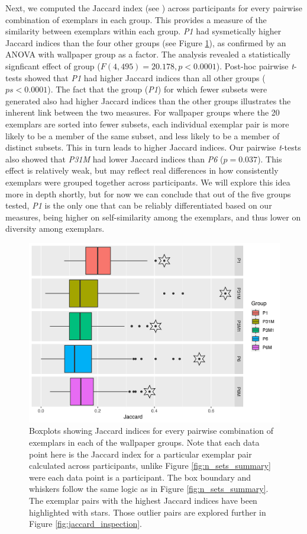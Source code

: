 \documentclass[11pt, twoside]{article}
\begin{document}
Next, we computed the Jaccard index (see ) across participants for every pairwise combination of exemplars in each group. This provides a measure of the similarity between exemplars within each group. \textit{P1} had sysmetically higher Jaccard indices than the four other groups (see Figure \ref{fig:jaccard_summary}), as confirmed by an ANOVA with wallpaper group as a factor. The analysis revealed a statistically signficant effect of group ($F(4, 495)=20.178, p < 0.0001$). Post-hoc pairwise \textit{t}-tests showed that \textit{P1} had higher Jaccard indices than all other groups ($ps < 0.0001$). The fact that the group (\textit{P1}) for which fewer subsets were generated also had higher Jaccard indices than the other groups illustrates the inherent link between the two measures. For wallpaper groups where the 20 exemplars are sorted into fewer subsets, each individual exemplar pair is more likely to be a member of the same subset, and less likely to be a member of distinct subsets. This in turn leads to higher Jaccard indices. Our pairwise \textit{t}-tests also showed that \textit{P31M} had lower Jaccard indices than \textit{P6} ($p = 0.037$). This effect is relatively weak, but may reflect real differences in how consistently exemplars were grouped together across participants. We will explore this idea more in depth shortly, but for now we can conclude that out of the five groups tested, \textit{P1} is the only one that can be reliably differentiated based on our measures, being higher on self-similarity among the exemplars, and thus lower on diversity among exemplars. 

\begin{figure}[t]
	\centering
	\includegraphics[width=\linewidth]{./figures/jaccard_summary.pdf}
	\caption{Boxplots showing Jaccard indices for every pairwise combination of exemplars in each of the wallpaper groups. Note that each data point here is the Jaccard index for a particular exemplar pair calculated across participants, unlike Figure \ref{fig:n_sets_summary} were each data point is a participant. The box boundary and whiskers follow the same logic as in Figure \ref{fig:n_sets_summary}. The exemplar pairs with the highest Jaccard indices have been highlighted with stars. Those outlier pairs are explored further in Figure \ref{fig:jaccard_inspection}.}
	\label{fig:jaccard_summary}
\end{figure}
\end{document}
